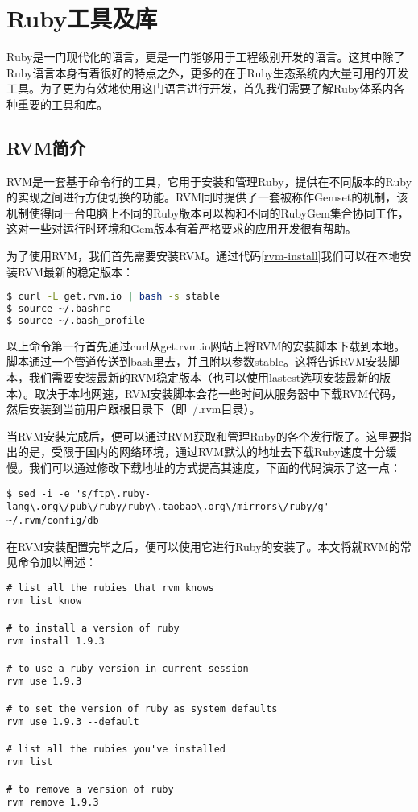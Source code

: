 \section{Ruby工具及库}
Ruby是一门现代化的语言，更是一门能够用于工程级别开发的语言。这其中除了Ruby语言本身有着很好的特点之外，更多的在于Ruby生态系统内大量可用的开发工具。为了更为有效地使用这门语言进行开发，首先我们需要了解Ruby体系内各种重要的工具和库。
\subsection{RVM简介}
RVM是一套基于命令行的工具，它用于安装和管理Ruby，提供在不同版本的Ruby的实现之间进行方便切换的功能。RVM同时提供了一套被称作Gemset的机制，该机制使得同一台电脑上不同的Ruby版本可以构和不同的RubyGem集合协同工作，这对一些对运行时环境和Gem版本有着严格要求的应用开发很有帮助。

为了使用RVM，我们首先需要安装RVM。通过代码\ref{rvm-install}我们可以在本地安装RVM最新的稳定版本：

\begin{lstlisting}[language=bash, caption={安装RVM}, label={rvm-install}]
$ curl -L get.rvm.io | bash -s stable
$ source ~/.bashrc
$ source ~/.bash_profile
\end{lstlisting}

以上命令第一行首先通过curl从get.rvm.io网站上将RVM的安装脚本下载到本地。脚本通过一个管道传送到bash里去，并且附以参数stable。这将告诉RVM安装脚本，我们需要安装最新的RVM稳定版本（也可以使用lastest选项安装最新的版本）。取决于本地网速，RVM安装脚本会花一些时间从服务器中下载RVM代码，然后安装到当前用户跟根目录下（即~/.rvm目录）。

当RVM安装完成后，便可以通过RVM获取和管理Ruby的各个发行版了。这里要指出的是，受限于国内的网络环境，通过RVM默认的地址去下载Ruby速度十分缓慢。我们可以通过修改下载地址的方式提高其速度，下面的代码演示了这一点：

\begin{lstlisting}[numbers=none, caption={更改RVM默认安装源}]
$ sed -i -e 's/ftp\.ruby-lang\.org\/pub\/ruby/ruby\.taobao\.org\/mirrors\/ruby/g' ~/.rvm/config/db
\end{lstlisting}

在RVM安装配置完毕之后，便可以使用它进行Ruby的安装了。本文将就RVM的常见命令加以阐述：

\begin{lstlisting}[caption={RVM常见命令说明}, label={rvm-com}]
# list all the rubies that rvm knows
rvm list know

# to install a version of ruby
rvm install 1.9.3

# to use a ruby version in current session
rvm use 1.9.3

# to set the version of ruby as system defaults
rvm use 1.9.3 --default

# list all the rubies you've installed
rvm list

# to remove a version of ruby 
rvm remove 1.9.3
\end{lstlisting}

